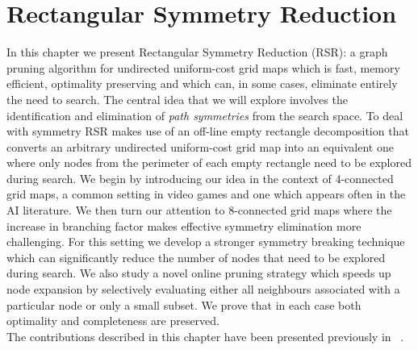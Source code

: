 \chapter{Rectangular Symmetry Reduction}
\label{cha:rsr}
In this chapter we present Rectangular Symmetry Reduction (RSR): a graph pruning
algorithm for undirected uniform-cost grid maps which is fast, memory efficient,
optimality preserving and which can, in some cases, eliminate entirely the need
to search.  The central idea that we will explore involves the identification
and elimination of \emph{path symmetries} from the search space. 
To deal with symmetry RSR makes use of an off-line
empty rectangle decomposition that converts an arbitrary
undirected uniform-cost grid map into an equivalent one where only nodes
from the perimeter of each empty rectangle need to be explored during search.
We begin by introducing our idea in the context of 4-connected grid maps, a common
setting in video games and one which appears often in the AI literature.
We then turn our attention to 8-connected grid maps where the increase in
branching factor makes effective symmetry elimination more challenging. 
For this setting we develop a stronger symmetry breaking technique which can significantly
reduce the number of nodes that need to be explored during search. We also study a novel 
online pruning strategy which speeds up node expansion by selectively evaluating either 
all neighbours associated with a particular node or only a small subset.  
We prove that in each case both optimality and completeness are preserved.
\\ \newline
The contributions described in this chapter have been presented previously in
~\cite{harabor10,harabor11a,harabor11c}.

